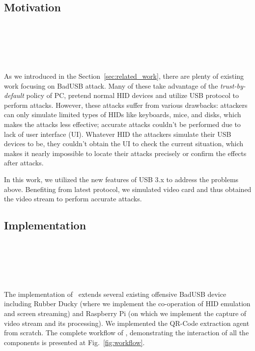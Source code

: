 \section{\tool}
\label{sec:badusb}
\subsection{Motivation}
\noindent{}\\
\\
\\
\\
\\
As we introduced in the Section~\ref{sec:related_work}, there are plenty of existing work  focusing on BadUSB attack. 
Many of these take advantage of the \textit{trust-by-default} policy of PC, pretend normal HID devices and utilize USB protocol to perform attacks. 
However, these attacks suffer from various drawbacks:
 attackers can only simulate limited types of HIDs like keyboards, mice, and disks, which makes the attacks less effective;
 accurate attacks couldn't be performed due to lack of user interface (UI).
Whatever HID the attackers simulate their USB devices to be, they couldn't obtain the UI to check the current situation, which makes it nearly impossible to locate their attacks precisely or confirm the effects after attacks.

In this work, we utilized the new features of USB 3.x \cite{usb31} \cite{usb32} to address the problems above.
Benefiting from latest protocol, we simulated video card and thus obtained the video stream to perform accurate attacks.

\subsection{Implementation}
\noindent{}\\
\\
\\
\\
\\
The implementation of \tool\ extends several existing offensive BadUSB device including Rubber Ducky (where we implement the co-operation of HID emulation and screen streaming) and Raspberry Pi (on which we implement the capture of video stream and its processing). We implemented the QR-Code extraction agent from scratch. The complete workflow of \tool, demonstrating the interaction of all the components is presented at Fig.~\ref{fig:workflow}.

